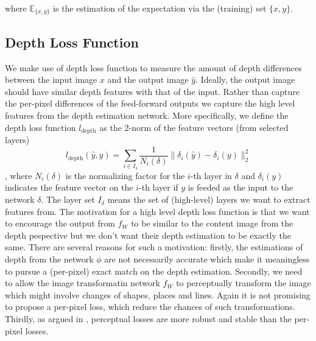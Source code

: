 \documentclass[10pt,twocolumn,letterpaper]{article}
\begin{document}
where $\mathbb E_{\{x,y\}}$ is the estimation of the expectation via the (training) set $\{x,y\}$.

\subsection{Depth Loss Function}

We make use of depth loss function to measure the amount of depth differences between the input image $x$ and the output image $\hat y$. Ideally, the output image should have similar depth features with that of the input. Rather than capture the per-pixel differences of the feed-forward outputs we capture the high level features from the depth estimation network. More specifically, we define the depth loss function $l_\text{depth}$ as the 2-norm of the feature vectors (from selected layers) \[l_\text{depth}(\hat y, y) = \sum_{i \in I_\delta} \frac{1}{N_i (\delta)}\|\delta_i(\hat y) - \delta_i(y)\|_2^2\], where $N_i(\delta)$ is the normalizing factor for the $i$-th layer in $\delta$ and $\delta_i(y)$ indicates the feature vector on the $i$-th layer if $y$ is feeded as the input to the network $\delta$. The layer set $I_\delta$ means the set of (high-level) layers we want to extract features from. The motivation for a high level depth loss function is that we want to encourage the output from $f_W$ to be similar to the content image from the depth pespective but we don't want their depth estimation to be exactly the same. There are several reasons for such a motivation: firstly, the estimations of depth from the network $\phi$ are not necessarily accurate which make it meaningless to pursue a (per-pixel) exact match on the depth estimation. Secondly, we need to allow the image transformatin network $f_W$ to perceptually transform the image which might involve changes of shapes, places and lines. Again it is not promising to propose a per-pixel loss, which reduce the chances of such transformations. Thirdly, as argued in \cite{johnson2016perceptual}, perceptual losses are more robust and stable than the per-pixel losses.
\end{document}
